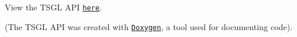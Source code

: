 View the T\-S\-G\-L A\-P\-I \href{http://calvin-cs.github.io/TSGL/html/annotated.html}{\tt here}.

(The T\-S\-G\-L A\-P\-I was created with \href{http://www.stack.nl/~dimitri/doxygen/}{\tt Doxygen}, a tool used for documenting code). 